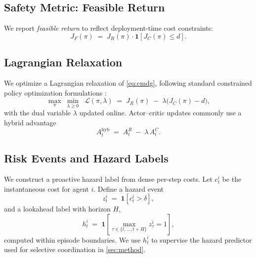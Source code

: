 \documentclass{article}
\theoremstyle{plain}
\theoremstyle{definition}
\theoremstyle{remark}
\begin{document}
\subsection{Safety Metric: Feasible Return}
\label{sec:safety-metrics}
We report \emph{feasible return} to reflect deployment-time cost constraints:
\begin{equation}
J_F(\pi) \;=\; J_R(\pi)\cdot \mathbf{1}\!\left[J_C(\pi)\le d\right].
\label{eq:feasible}
\end{equation}

\subsection{Lagrangian Relaxation}
\label{sec:lagrangian-prelims}
We optimize a Lagrangian relaxation of \cref{eq:cmdg}, following standard constrained policy optimization formulations \cite{achiam2017constrainedpolicyoptimization}:
\begin{equation}
\max_{\pi}\; \min_{\lambda\ge 0}\;\; \mathcal{L}(\pi,\lambda)
\;=\;
J_R(\pi)\;-\;\lambda\big(J_C(\pi)-d\big),
\label{eq:lagrangian}
\end{equation}
with the dual variable $\lambda$ updated online. Actor--critic updates commonly use a hybrid advantage \cite{tessler2018rcpo, ray2019safexp, zhang2020orderconstrainedoptimizationpolicy}
\begin{equation}
A^{\text{hyb}}_t \;=\; A^{R}_t \;-\; \lambda\, A^{C}_t.
\label{eq:hybrid-adv}
\end{equation}

\subsection{Risk Events and Hazard Labels}
\label{sec:hazard-labels}
We construct a proactive hazard label from dense per-step costs. Let $c_t^i$ be the instantaneous cost for agent $i$.
Define a hazard event
\begin{equation}
z_t^i \;=\; \mathbf{1}\!\left[c_t^i > \delta\right],
\label{eq:inst-hazard}
\end{equation}
and a lookahead label with horizon $H$,
\begin{equation}
h_t^i
\;=\;
\mathbf{1}\!\left[\max_{\tau \in \{t,\dots,t+H\}} z_\tau^i = 1\right],
\label{eq:lookahead-hazard}
\end{equation}
computed within episode boundaries. We use $h_t^i$ to supervise the hazard predictor used for selective coordination in \cref{sec:method}.
\end{document}

